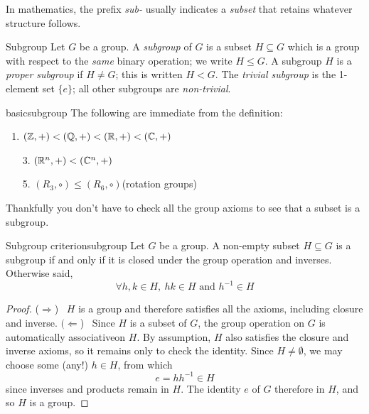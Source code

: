 In mathematics, the prefix \emph{sub-} usually indicates a \emph{subset} that retains whatever structure follows.

\begin{defn}{Subgroup}{}
Let $G$ be a group. A \emph{subgroup} of $G$ is a subset $H\subseteq G$ which is a group with respect to the \emph{same} binary operation; we write $H\le G$.\smallbreak
A subgroup $H$ is a \emph{proper subgroup} if $H\neq G$; this is written $H<G$.\smallbreak
The \emph{trivial subgroup} is the 1-element set $\{e\}$; all other subgroups are \emph{non-trivial}.
\end{defn}


\begin{examples}{}{basicsubgroup}
The following are immediate from the definition:
\begin{enumerate}\itemsep2pt
  \item\label{ex:basicsubgroup1} $(\mathbb{Z},+)<(\mathbb{Q},+)<(\mathbb{R},+)<(\mathbb{C},+)$
	\item[3.] $(\mathbb{R}^n,+)<(\mathbb{C}^n,+)$
	\item[5.]  $(R_3,\circ)\le (R_6,\circ)$\quad (rotation groups)
\end{enumerate}
\end{examples}

Thankfully you don't have to check all the group axioms to see that a subset is a subgroup.

\begin{thm}{Subgroup criterion}{subgroup}
Let $G$ be a group. A non-empty subset $H\subseteq G$ is a subgroup if and only if it is closed under the group operation and inverses. Otherwise said,
\[\forall h,k\in H,\ hk\in H \text{ and }  h^{-1}\in H\]
\end{thm}

\begin{proof}
($\Rightarrow$) \ $H$ is a group and therefore satisfies all the axioms, including closure and inverse.\smallbreak
$(\Leftarrow$) \ Since $H$ is a subset of $G$, the group operation on $G$ is automatically associative\footnotemark on $H$. By assumption, $H$ also satisfies the closure and inverse axioms, so it remains only to check the identity.\smallbreak
Since $H\neq\emptyset$, we may choose some (any!) $h\in H$, from which
\[e=hh^{-1}\in H\]
since inverses and products remain in $H$. The identity $e$ of $G$ therefore in $H$, and so $H$ is a group.
\end{proof}

